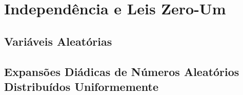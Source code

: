 \chapter[Aula 7]{Independência e Leis Zero-Um}
\chaptermark{}

\section{Variáveis Aleatórias}


\section{Expansões Diádicas de Números Aleatórios Distribuídos Uniformemente}

